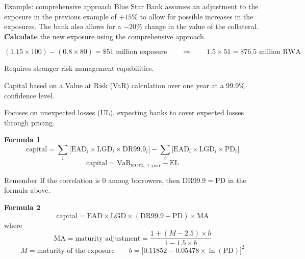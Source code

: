 \begin{orexambox}{Example: comprehensive approach}
Blue Star Bank assumes an adjustment to the exposure in the previous example of
$+15\%$ to allow for possible increases in the exposures. The bank also allows for
a $-20\%$ change in the value of the collateral. \textbf{Calculate} the new
exposure using the comprehensive approach.

\vspace{6pt}
\par
\[
(1.15\times100)-(0.8\times80)=\$51\text{ million exposure}
\qquad\Longrightarrow\qquad
1.5\times51=\$76.5\text{ million RWA}
\]
\end{orexambox}


\begin{lettered}
\item Requires stronger risk management capabilities.
\item Capital based on a Value at Risk (VaR) calculation over one year at a 99.9\%
confidence level.
\item Focuses on unexpected losses (UL), expecting banks to cover expected losses
through pricing.
\end{lettered}

\begin{orkeybox}
{\sffamily\bfseries\fontsize{8.6}{10}\selectfont\color{navy}Formula 1}
\[
\text{capital}=\sum_i\bigl[\mathrm{EAD}_i\times \mathrm{LGD}_i\times \mathrm{DR}99.9_i\bigr]
-\sum_i\bigl[\mathrm{EAD}_i\times \mathrm{LGD}_i\times \mathrm{PD}_i\bigr]
\]
\[
\text{capital}=\mathrm{VaR}_{99.9\%,\,1\text{-year}}-\mathrm{EL}
\]
\end{orkeybox}

\begin{ornotebox}{Remember}
If the correlation is 0 among borrowers, then $\mathrm{DR}99.9=\mathrm{PD}$ in the
formula above.
\end{ornotebox}

\begin{orkeybox}
{\sffamily\bfseries\fontsize{8.6}{10}\selectfont\color{navy}Formula 2}
\[
\text{capital}=\mathrm{EAD}\times \mathrm{LGD}\times(\mathrm{DR}99.9-\mathrm{PD})\times \mathrm{MA}
\]
where
\[
\mathrm{MA}=\text{maturity adjustment}=\frac{1+(M-2.5)\times b}{1-1.5\times b}
\]
\[
M=\text{maturity of the exposure}\qquad
b=\bigl[0.11852-0.05478\times\ln(\mathrm{PD})\bigr]^{2}
\]
\end{orkeybox}

